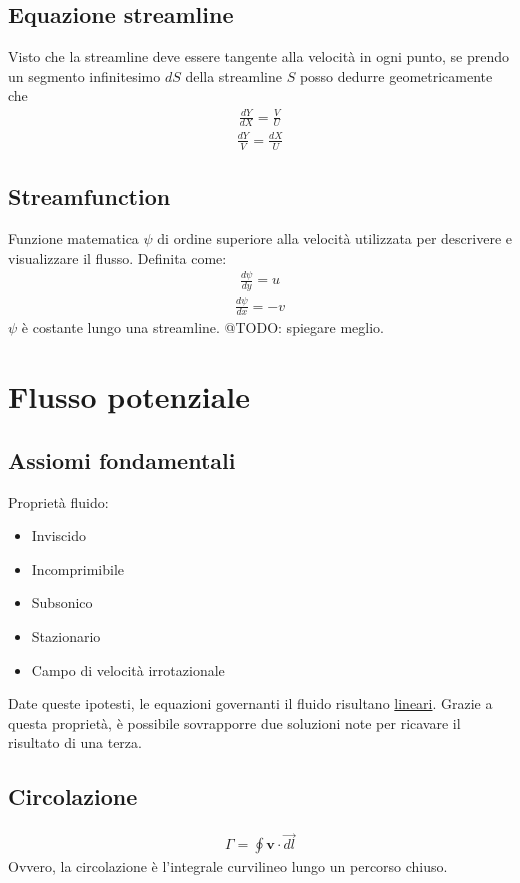 \documentclass[11pt]{article}
\begin{document}
\subsection{Equazione streamline}
\label{sec:orge61ec06}
Visto che la streamline deve essere tangente alla velocità in ogni punto, se prendo un segmento infinitesimo \(dS\) della streamline \(S\) posso dedurre geometricamente che
\begin{gather*}
    \frac{dY}{dX} = \frac{V}{U}
\end{gather*}
\begin{gather*}
    \frac{dY}{V} = \frac{dX}{U}
\end{gather*}
\subsection{Streamfunction}
\label{sec:org646206a}
Funzione matematica \(\psi\) di ordine superiore alla velocità utilizzata per descrivere e visualizzare il flusso. Definita come:
\begin{gather*}
    \frac{d \psi}{dy} = u
\end{gather*}
\begin{gather*}
    \frac{d \psi}{dx} = -v
\end{gather*}
\(\psi\) è costante lungo una streamline. @TODO: spiegare meglio.
\section{Flusso potenziale}
\label{sec:org24abcc0}
\subsection{Assiomi fondamentali}
\label{sec:orgb852d5d}
Proprietà fluido:
\begin{itemize}
\item Inviscido
\item Incomprimibile
\item Subsonico
\item Stazionario
\item Campo di velocità irrotazionale
\end{itemize}
Date queste ipotesti, le equazioni governanti il fluido risultano \uline{lineari}. Grazie a questa proprietà, è possibile sovrapporre due soluzioni note per ricavare il risultato di una terza.
\subsection{Circolazione}
\label{sec:org21214e4}
\begin{gather*}
    \Gamma = \oint \mathbf v \cdot \vec{dl}
\end{gather*}
Ovvero, la circolazione è l'integrale curvilineo lungo un percorso chiuso.
\end{document}

